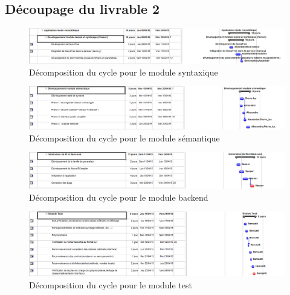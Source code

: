 \documentclass{../res/univ-projet}
\begin{document}
    \subsection{Découpage du livrable 2}
      \begin{figure}[!h]
        \includegraphics[width=17.8cm]{img_Gantt/Gantt_livrable2_Module_Syntaxe.PNG}
        \caption{Décomposition du cycle pour le module syntaxique}
        \label{decomposition_cycle_livrable_2}
      \end{figure}
      \begin{figure}[!h]
        \includegraphics[width=17.8cm]{img_Gantt/Livrable2_Module_Semantique.PNG}
        \caption{Décomposition du cycle pour le module sémantique}
        \label{decomposition_cycle_livrable_2}
      \end{figure}
      \begin{figure}[!h]
        \includegraphics[width=17.8cm]{img_Gantt/Livrable2_Module_BackEnd.PNG}
        \caption{Décomposition du cycle pour le module backend}
        \label{decomposition_cycle_livrable_2}
      \end{figure}
      \begin{figure}[!h]
        \includegraphics[width=17.8cm]{img_Gantt/Livrable2_Module_Test.PNG}
        \caption{Décomposition du cycle pour le module test}
        \label{decomposition_cycle_livrable_2}
      \end{figure}
\end{document}
